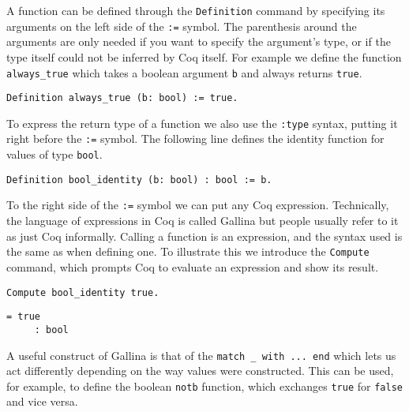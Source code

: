 A function can be defined through the \texttt{Definition} command by specifying its arguments on
the left side of the \texttt{:=} symbol. The parenthesis around the arguments are only needed if you 
want to specify the argument's type, or if the type itself could not be inferred by Coq itself. For 
example we define the function \texttt{always_true} which takes a boolean argument 
\texttt{b} and always returns \texttt{true}.

\begin{verbatim}
Definition always_true (b: bool) := true.
\end{verbatim}

To express the return type of a function we also use the \texttt{:type} syntax, putting it 
right before the \texttt{:=} symbol. The following line defines the identity function for
values of type \texttt{bool}.

\begin{verbatim}
Definition bool_identity (b: bool) : bool := b.
\end{verbatim}

To the right side of the \texttt{:=} symbol we can put any Coq expression. Technically, the 
language of expressions in Coq is called Gallina
but people usually refer to it as just Coq informally. Calling a function is an expression, and the syntax
used is the same as when defining one. To illustrate this we introduce the \texttt{Compute}
command, which prompts Coq to evaluate an expression and show its result. 

\begin{verbatim}
Compute bool_identity true.
\end{verbatim}
\vspace{-\baselineskip*3/2}
\begin{verbatim}
= true
     : bool
\end{verbatim}

A useful construct of Gallina is that of the 
\texttt{match _ with ... end} which lets us act differently depending on the way values were
constructed. This can be used, for example, to define the boolean \texttt{notb} function,
which exchanges \texttt{true} for \texttt{false} and vice versa.

